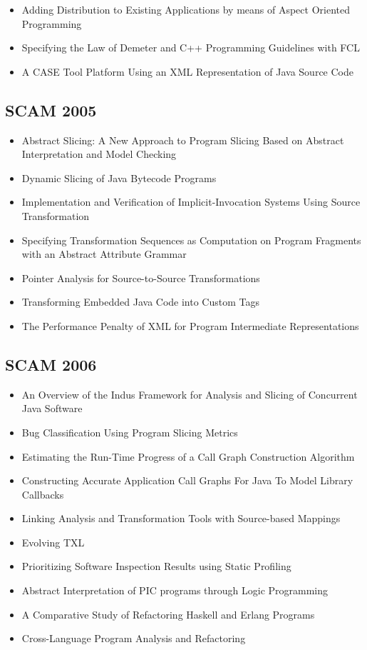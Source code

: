 {\small
\begin{itemize}[itemsep=-1ex]
  \item Adding Distribution to Existing Applications by means of Aspect Oriented Programming
  \item Specifying the Law of Demeter and C++ Programming Guidelines with FCL
  \item A CASE Tool Platform Using an XML Representation of Java Source Code
\end{itemize}
}

\subsection{SCAM 2005}

{\small
\begin{itemize}[itemsep=-1ex]
  \item Abstract Slicing: A New Approach to Program Slicing Based on Abstract Interpretation and Model Checking
  \item Dynamic Slicing of Java Bytecode Programs
  \item Implementation and Verification of Implicit-Invocation Systems Using Source Transformation
  \item Specifying Transformation Sequences as Computation on Program Fragments with an Abstract Attribute Grammar
  \item Pointer Analysis for Source-to-Source Transformations
  \item Transforming Embedded Java Code into Custom Tags
  \item The Performance Penalty of XML for Program Intermediate Representations
\end{itemize}
}

\subsection{SCAM 2006}

{\small
\begin{itemize}[itemsep=-1ex]
  \item An Overview of the Indus Framework for Analysis and Slicing of Concurrent Java Software
  \item Bug Classification Using Program Slicing Metrics
  \item Estimating the Run-Time Progress of a Call Graph Construction Algorithm
  \item Constructing Accurate Application Call Graphs For Java To Model Library Callbacks
  \item Linking Analysis and Transformation Tools with Source-based Mappings
  \item Evolving TXL
  \item Prioritizing Software Inspection Results using Static Profiling
  \item Abstract Interpretation of PIC programs through Logic Programming
  \item A Comparative Study of Refactoring Haskell and Erlang Programs
  \item Cross-Language Program Analysis and Refactoring
\end{itemize}
}

